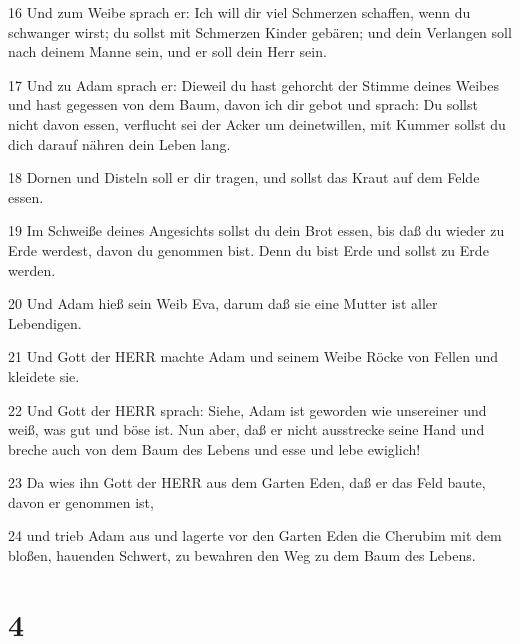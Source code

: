 \par 16 Und zum Weibe sprach er: Ich will dir viel Schmerzen schaffen, wenn du schwanger wirst; du sollst mit Schmerzen Kinder gebären; und dein Verlangen soll nach deinem Manne sein, und er soll dein Herr sein.
\par 17 Und zu Adam sprach er: Dieweil du hast gehorcht der Stimme deines Weibes und hast gegessen von dem Baum, davon ich dir gebot und sprach: Du sollst nicht davon essen, verflucht sei der Acker um deinetwillen, mit Kummer sollst du dich darauf nähren dein Leben lang.
\par 18 Dornen und Disteln soll er dir tragen, und sollst das Kraut auf dem Felde essen.
\par 19 Im Schweiße deines Angesichts sollst du dein Brot essen, bis daß du wieder zu Erde werdest, davon du genommen bist. Denn du bist Erde und sollst zu Erde werden.
\par 20 Und Adam hieß sein Weib Eva, darum daß sie eine Mutter ist aller Lebendigen.
\par 21 Und Gott der HERR machte Adam und seinem Weibe Röcke von Fellen und kleidete sie.
\par 22 Und Gott der HERR sprach: Siehe, Adam ist geworden wie unsereiner und weiß, was gut und böse ist. Nun aber, daß er nicht ausstrecke seine Hand und breche auch von dem Baum des Lebens und esse und lebe ewiglich!
\par 23 Da wies ihn Gott der HERR aus dem Garten Eden, daß er das Feld baute, davon er genommen ist,
\par 24 und trieb Adam aus und lagerte vor den Garten Eden die Cherubim mit dem bloßen, hauenden Schwert, zu bewahren den Weg zu dem Baum des Lebens.

\chapter{4}

